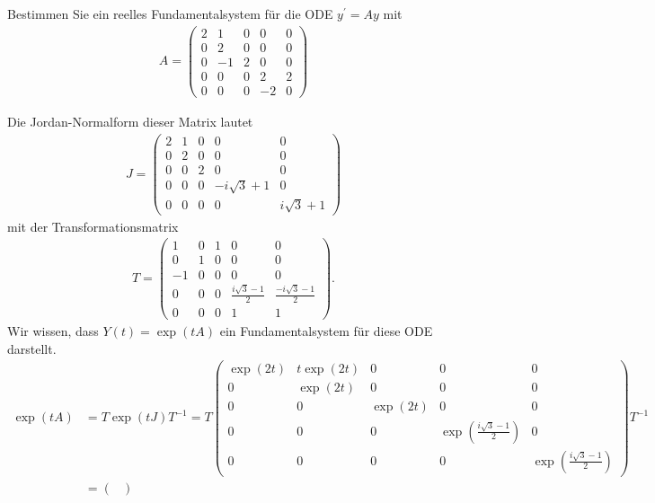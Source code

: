 \begin{exercise}
Bestimmen Sie ein reelles Fundamentalsystem für die ODE $y^{\prime}
= Ay$ mit
\begin{align*}
  A = \begin{pmatrix}
    2 & 1 & 0 & 0 & 0 \\
    0 & 2 & 0 & 0 & 0 \\
    0 & -1 & 2 & 0 & 0 \\
    0 & 0 & 0 & 2 & 2 \\
    0 & 0 & 0 & -2 & 0
  \end{pmatrix}
\end{align*}
\end{exercise}
\begin{solution}
Die Jordan-Normalform dieser Matrix lautet
\begin{align*}
J = \begin{pmatrix}
  2 & 1 & 0 & 0 & 0 \\
  0 & 2 & 0 & 0 & 0 \\
  0 & 0 & 2 & 0 & 0 \\
  0 & 0 & 0 & -i\sqrt{3} + 1  & 0 \\
  0 & 0 & 0 & 0 & i\sqrt{3} + 1
\end{pmatrix}
\end{align*}
mit der Transformationsmatrix
\begin{align*}
T =
\begin{pmatrix}
  1 & 0 & 1 & 0 & 0 \\
  0 & 1 & 0 & 0 & 0 \\
  -1 & 0 & 0 & 0 & 0 \\
  0 & 0 & 0 & \frac{i\sqrt{3} - 1}{2}  & \frac{-i\sqrt{3} - 1}{2} \\
  0 & 0 & 0 & 1 & 1
\end{pmatrix}.
\end{align*}
Wir wissen, dass $Y(t) = \exp(tA)$ ein Fundamentalsystem für diese ODE darstellt.
\begin{align*}
  \exp(tA) &= T\exp(tJ)T^{-1}
  = T\begin{pmatrix}
    \exp(2t) & t\exp(2t) & 0 & 0 & 0 \\
    0 & \exp(2t) & 0 & 0 & 0 \\
    0 & 0 & \exp(2t) & 0 & 0 \\
    0 & 0 & 0 & \exp(\frac{i\sqrt{3} - 1}{2}) & 0 \\
    0 & 0 & 0 & 0 & \exp(\frac{i\sqrt{3} - 1}{2})
  \end{pmatrix}T^{-1} \\
  &= \begin{pmatrix}

\end{pmatrix}
\end{align*}
\end{solution}
